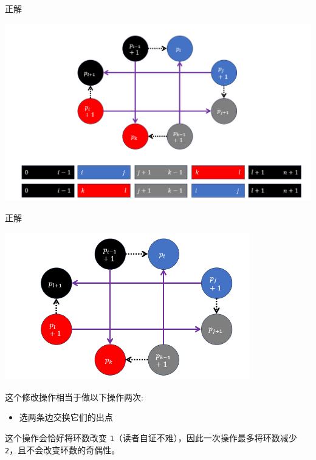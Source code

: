 \begin{frame}{正解}

	\centering\includegraphics[width=\textwidth,keepaspectratio]{sources/A2.jpg}

\end{frame}

\begin{frame}{正解}

	\includegraphics[width=0.8\textwidth,keepaspectratio]{sources/A3.jpg}

	这个修改操作相当于做以下操作两次:

	\begin{itemize}
	\item 选两条边交换它们的出点
	\end{itemize}

	这个操作会恰好将环数改变 \texttt{1}（读者自证不难），因此一次操作最多将环数减少 \texttt{2}，且不会改变环数的奇偶性。

\end{frame}


